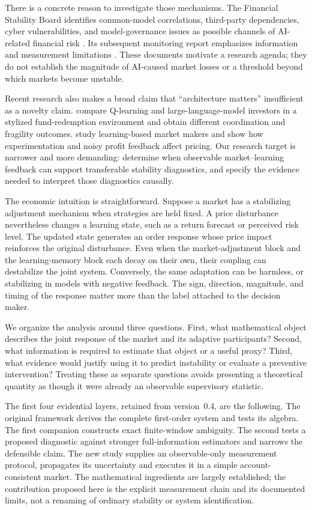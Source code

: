\documentclass[11pt,a4paper]{article}
\theoremstyle{definition}
\theoremstyle{remark}
\begin{document}
There is a concrete reason to investigate those mechanisms. The Financial Stability Board identifies common-model correlations, third-party dependencies, cyber vulnerabilities, and model-governance issues as possible channels of AI-related financial risk \citep{fsb2024}. Its subsequent monitoring report emphasizes information and measurement limitations \citep{fsb2025}. These documents motivate a research agenda; they do not establish the magnitude of AI-caused market losses or a threshold beyond which markets become unstable.

Recent research also makes a broad claim that ``architecture matters'' insufficient as a novelty claim. \citet{anand2026} compare Q-learning and large-language-model investors in a stylized fund-redemption environment and obtain different coordination and fragility outcomes. \citet{colliard2026} study learning-based market makers and show how experimentation and noisy profit feedback affect pricing. Our research target is narrower and more demanding: determine when observable market--learning feedback can support transferable stability diagnostics, and specify the evidence needed to interpret those diagnostics causally.

The economic intuition is straightforward. Suppose a market has a stabilizing adjustment mechanism when strategies are held fixed. A price disturbance nevertheless changes a learning state, such as a return forecast or perceived risk level. The updated state generates an order response whose price impact reinforces the original disturbance. Even when the market-adjustment block and the learning-memory block each decay on their own, their coupling can destabilize the joint system. Conversely, the same adaptation can be harmless, or stabilizing in models with negative feedback. The sign, direction, magnitude, and timing of the response matter more than the label attached to the decision maker.

We organize the analysis around three questions. First, what mathematical object describes the joint response of the market and its adaptive participants? Second, what information is required to estimate that object or a useful proxy? Third, what evidence would justify using it to predict instability or evaluate a preventive intervention? Treating these as separate questions avoids presenting a theoretical quantity as though it were already an observable supervisory statistic.

The first four evidential layers, retained from version~0.4, are the following. The original framework derives the complete first-order system and tests its algebra. The first companion constructs exact finite-window ambiguity. The second tests a proposed diagnostic against stronger full-information estimators and narrows the defensible claim. The new study supplies an observable-only measurement protocol, propagates its uncertainty and executes it in a simple account-consistent market. The mathematical ingredients are largely established; the contribution proposed here is the explicit measurement chain and its documented limits, not a renaming of ordinary stability or system identification.
\end{document}
